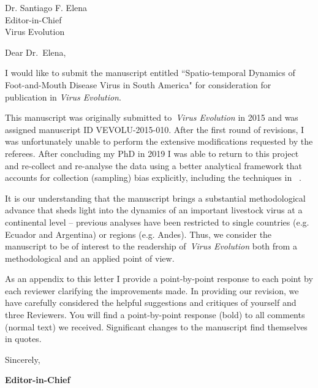 \documentclass[12pt, a4paper]{letter} %
\begin{document}
 



\begin{letter}{
	Dr. Santiago F. Elena\\
    Editor-in-Chief \\
    Virus Evolution
}


\opening{Dear Dr.~Elena,}

I would like to submit the manuscript entitled ``Spatio-temporal Dynamics of Foot-and-Mouth Disease Virus in South America" for consideration for publication in \textit{Virus Evolution}.

This manuscript was originally submitted to~\textit{Virus Evolution} in 2015 and was assigned manuscript ID VEVOLU-2015-010. 
After the first round of revisions, I was unfortunately unable to perform the extensive modifications requested by the referees.
After concluding my PhD in 2019 I was able to return to this project and re-collect and re-analyse the data using a better analytical framework that accounts for collection (sampling) bias explicitly, including the techniques in~\cite{Karcher2020} .

It is  our understanding that the manuscript brings a substantial methodological advance that sheds light into the dynamics of an important livestock virus at a continental level -- previous analyses have been restricted to single countries (e.g. Ecuador and Argentina) or regions (e.g. Andes).
Thus, we consider the manuscript to be of interest to the readership of~\textit{Virus Evolution} both from a methodological and an applied point of view.

As an appendix to this letter I provide a point-by-point response to each point by each reviewer clarifying the improvements made.
In providing our revision, we have carefully considered the helpful suggestions and critiques of yourself and three Reviewers.
You will find a point-by-point response (bold) to all comments (normal text) we received.
Significant changes to the manuscript find themselves in quotes.

\closing{Sincerely,}

\clearpage

\textbf{Editor-in-Chief}


\end{letter}
\end{document}
